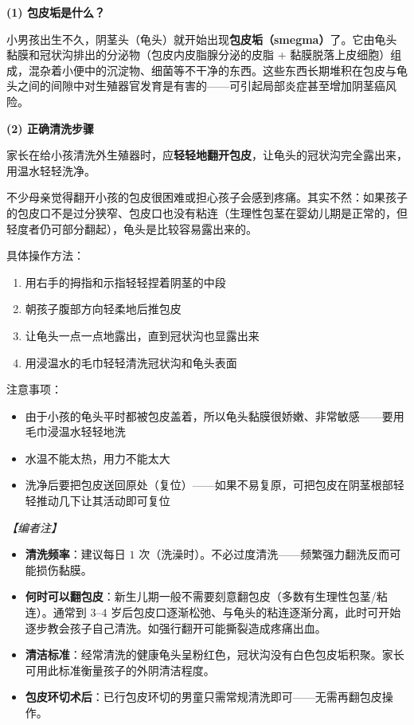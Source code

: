 \documentclass[12pt,a4paper,twoside]{ctexbook}
\begin{document}
\vspace{0.5em}
\noindent\textbf{(1) 包皮垢是什么？}

小男孩出生不久，阴茎头（龟头）就开始出现\textbf{包皮垢（smegma）}了。它由龟头黏膜和冠状沟排出的分泌物（包皮内皮脂腺分泌的皮脂 + 黏膜脱落上皮细胞）组成，混杂着小便中的沉淀物、细菌等不干净的东西。这些东西长期堆积在包皮与龟头之间的间隙中对生殖器官发育是有害的——可引起局部炎症甚至增加阴茎癌风险。

\vspace{0.3em}
\noindent\textbf{(2) 正确清洗步骤}

家长在给小孩清洗外生殖器时，应\textbf{轻轻地翻开包皮}，让龟头的冠状沟完全露出来，用温水轻轻洗净。

不少母亲觉得翻开小孩的包皮很困难或担心孩子会感到疼痛。其实不然：如果孩子的包皮口不是过分狭窄、包皮口也没有粘连（生理性包茎在婴幼儿期是正常的，但轻度者仍可部分翻起），龟头是比较容易露出来的。

具体操作方法：
\begin{enumerate}
	\item 用右手的拇指和示指轻轻捏着阴茎的中段
	\item 朝孩子腹部方向轻柔地后推包皮
	\item 让龟头一点一点地露出，直到冠状沟也显露出来
	\item 用浸温水的毛巾轻轻清洗冠状沟和龟头表面
\end{enumerate}

注意事项：
\begin{itemize}
	\item 由于小孩的龟头平时都被包皮盖着，所以龟头黏膜很娇嫩、非常敏感——要用毛巾浸温水轻轻地洗
	\item 水温不能太热，用力不能太大
	\item 洗净后要把包皮送回原处（复位）——如果不易复原，可把包皮在阴茎根部轻轻推动几下让其活动即可复位
\end{itemize}

\vspace{0.3em}
\noindent\textit{【编者注】}
\begin{itemize}
	\item \textbf{清洗频率}：建议每日 $1$ 次（洗澡时）。不必过度清洗——频繁强力翻洗反而可能损伤黏膜。
	\item \textbf{何时可以翻包皮}：新生儿期一般不需要刻意翻包皮（多数有生理性包茎/粘连）。通常到 $3$--$4$ 岁后包皮口逐渐松弛、与龟头的粘连逐渐分离，此时可开始逐步教会孩子自己清洗。如强行翻开可能撕裂造成疼痛出血。
	\item \textbf{清洁标准}：经常清洗的健康龟头呈粉红色，冠状沟没有白色包皮垢积聚。家长可用此标准衡量孩子的外阴清洁程度。
	\item \textbf{包皮环切术后}：已行包皮环切的男童只需常规清洗即可——无需再翻包皮操作。
\end{itemize}
\end{document}
